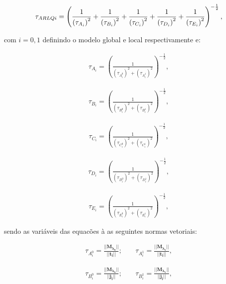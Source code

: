 \documentclass[tese_patricia]{subfiles}
\begin{document}
\begin{align}
	\tau_{ARLQi} = \left(\frac{1}{\left(\tau_{A_i}\right)^{2}} + \frac{1}{\left(\tau_{B_i}\right)^{2}} +  \frac{1}{\left(\tau_{C_i}\right)^{2}} + 
	\frac{1}{\left(\tau_{D_i}\right)^{2}} +
	\frac{1}{\left(\tau_{E_i}\right)^{2}}
	\right)^{-\frac{1}{2}},
\end{align}

\noindent com $i=0,1$ definindo o modelo global e local respectivamente e:

\begin{align}
	\tau_{A_{i}} = \left(\frac{1}{\left(\tau_{A_i^{0}}\right)^{2} + \left(\tau_{A_i^{1}}\right)^{2}} \right)^{-\frac{1}{2}}, \label{eq:tAi}
\end{align}

\begin{align}
	\tau_{B_{i}} = \left(\frac{1}{\left(\tau_{B_i^{0}}\right)^{2} + \left(\tau_{B_i^{1}}\right)^{2}} \right)^{-\frac{1}{2}},
\end{align}

\begin{align}
	\tau_{C_{i}} = \left(\frac{1}{\left(\tau_{C_i^{0}}\right)^{2} + \left(\tau_{C_i^{1}}\right)^{2}} \right)^{-\frac{1}{2}},
\end{align}

\begin{align}
	\tau_{D_{i}} = \left(\frac{1}{\left(\tau_{D_i^{0}}\right)^{2} + \left(\tau_{D_i^{1}}\right)^{2}} \right)^{-\frac{1}{2}},
\end{align}

\begin{align}
	\tau_{E_{i}} = \left(\frac{1}{\left(\tau_{E_i^{0}}\right)^{2} + \left(\tau_{E_i^{1}}\right)^{2}} \right)^{-\frac{1}{2}},\label{eq:tEi}
\end{align}

\noindent sendo as variáveis das equacões  à  as seguintes normas vetoriais:

\begin{align}
	\tau_{A_i^{0}} = \frac{|| \mathbf{M_{\lambda_0}} || }{||\mathbf{t_{i}} ||}; \ \ \ \ \  & \tau_{A_i^{1}} = \frac{|| \mathbf{M_{\lambda_1}} || }{||\mathbf{t_{i}} ||}  ,
\end{align}


\begin{align}
	\tau_{B_i^{0}} = \frac{|| \mathbf{M_{\lambda_0}} || }{||\mathbf{j_{i}} ||}; \ \ \ \ \  &  \tau_{B_i^{1}} = \frac{|| \mathbf{M_{\lambda_1}} || }{||\mathbf{j_{i}} ||}, 
\end{align}
\end{document}
